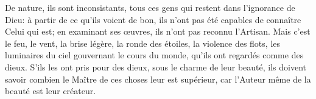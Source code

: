 De nature, ils sont inconsistants, tous ces gens qui restent dans l’ignorance de Dieu:
	à partir de ce qu’ils voient de bon,
		ils n’ont pas été capables de connaître Celui qui est;
	en examinant ses œuvres, ils n’ont pas reconnu l’Artisan.
Mais c’est le feu, le vent, la brise légère, la ronde des étoiles,
	la violence des flots, les luminaires du ciel gouvernant le cours du monde,
	qu’ils ont regardés comme des dieux.
S’ils les ont pris pour des dieux, sous le charme de leur beauté,
	ils doivent savoir combien le Maître de ces choses leur est supérieur,
	car l’Auteur même de la beauté est leur créateur.

